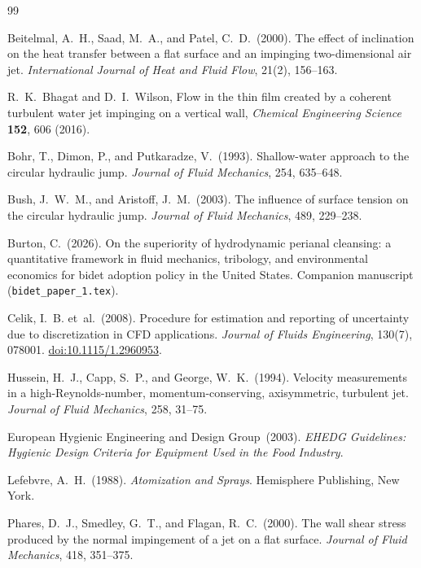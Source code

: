 \documentclass[aps,prfluids,reprint,amsmath,amssymb,floatfix]{revtex4-2}
\begin{document}
\begin{thebibliography}{99}

Beitelmal, A.~H., Saad, M.~A., and Patel, C.~D.\ (2000).
The effect of inclination on the heat transfer between a flat surface
and an impinging two-dimensional air jet.
\textit{International Journal of Heat and Fluid Flow}, 21(2), 156--163.

R.~K.~Bhagat and D.~I.~Wilson, Flow in the thin film created by a coherent
turbulent water jet impinging on a vertical wall,
\textit{Chemical Engineering Science} \textbf{152}, 606 (2016).

Bohr, T., Dimon, P., and Putkaradze, V.\ (1993).
Shallow-water approach to the circular hydraulic jump.
\textit{Journal of Fluid Mechanics}, 254, 635--648.

Bush, J.~W.~M., and Aristoff, J.~M.\ (2003).
The influence of surface tension on the circular hydraulic jump.
\textit{Journal of Fluid Mechanics}, 489, 229--238.

Burton, C.\ (2026).
On the superiority of hydrodynamic perianal cleansing: a quantitative
framework in fluid mechanics, tribology, and environmental economics
for bidet adoption policy in the United States.
Companion manuscript (\texttt{bidet\_paper\_1.tex}).

Celik, I.~B. et~al.\ (2008).
Procedure for estimation and reporting of uncertainty due to discretization
in CFD applications.
\textit{Journal of Fluids Engineering}, 130(7), 078001.
\href{https://doi.org/10.1115/1.2960953}{doi:10.1115/1.2960953}.

Hussein, H.~J., Capp, S.~P., and George, W.~K.\ (1994).
Velocity measurements in a high-Reynolds-number, momentum-conserving,
axisymmetric, turbulent jet.
\textit{Journal of Fluid Mechanics}, 258, 31--75.

European Hygienic Engineering and Design Group\ (2003).
\textit{EHEDG Guidelines: Hygienic Design Criteria for Equipment Used
in the Food Industry}.

Lefebvre, A.~H.\ (1988).
\textit{Atomization and Sprays}.
Hemisphere Publishing, New York.

Phares, D.~J., Smedley, G.~T., and Flagan, R.~C.\ (2000).
The wall shear stress produced by the normal impingement of a jet
on a flat surface.
\textit{Journal of Fluid Mechanics}, 418, 351--375.


\end{thebibliography}
\end{document}

